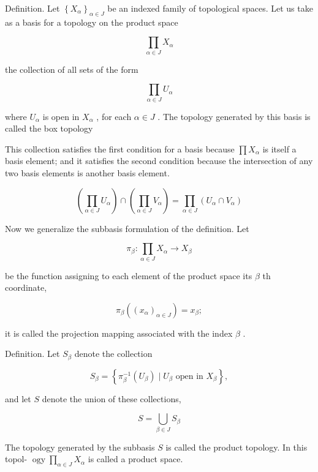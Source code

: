 \documentclass[10pt]{article}
\begin{document}
Definition. Let \({\left\{  {X}_{\alpha }\right\}  }_{\alpha  \in  J}\) be an indexed family of topological spaces. Let us take as a basis for a topology on the product space

\[
\mathop{\prod }\limits_{{\alpha  \in  J}}{X}_{\alpha }
\]

the collection of all sets of the form

\[
\mathop{\prod }\limits_{{\alpha  \in  J}}{U}_{\alpha }
\]

where \({U}_{\alpha }\) is open in \({X}_{\alpha }\) , for each \(\alpha  \in  J\) . The topology generated by this basis is called the box topology

This collection satisfies the first condition for a basis because \(\prod {X}_{\alpha }\) is itself a basis element; and it satisfies the second condition because the intersection of any two basis elements is another basis element.

\[
\left( {\mathop{\prod }\limits_{{\alpha  \in  J}}{U}_{\alpha }}\right)  \cap  \left( {\mathop{\prod }\limits_{{\alpha  \in  J}}{V}_{\alpha }}\right)  = \mathop{\prod }\limits_{{\alpha  \in  J}}\left( {{U}_{\alpha } \cap  {V}_{\alpha }}\right)
\]

Now we generalize the subbasis formulation of the definition. Let

\[
{\pi }_{\beta } : \mathop{\prod }\limits_{{\alpha  \in  J}}{X}_{\alpha } \rightarrow  {X}_{\beta }
\]

be the function assigning to each element of the product space its \(\beta\) th coordinate,

\[
{\pi }_{\beta }\left( {\left( {x}_{\alpha }\right) }_{\alpha  \in  J}\right)  = {x}_{\beta };
\]

it is called the projection mapping associated with the index \(\beta\) .

Definition. Let \({S}_{\beta }\) denote the collection

\[
{S}_{\beta } = \left\{  {{\pi }_{\beta }^{-1}\left( {U}_{\beta }\right)  \mid  {U}_{\beta }\text{ open in }{X}_{\beta }}\right\}  ,
\]

and let \(S\) denote the union of these collections,

\[
S = \mathop{\bigcup }\limits_{{\beta  \in  J}}{S}_{\beta }
\]

The topology generated by the subbasis \(S\) is called the product topology. In this topol- \(\operatorname{ogy}\mathop{\prod }\limits_{{\alpha  \in  J}}{X}_{\alpha }\) is called a product space.
\end{document}
